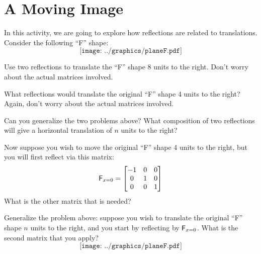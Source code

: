 \newpage
\section{A Moving Image}

In this activity, we are going to explore how reflections are related
to translations.  Consider the following ``F'' shape:
\[
\texttt{[image: ../graphics/planeF.pdf]}
\]

\begin{prob}
Use two reflections to translate the ``F'' shape 8 units to the
right. Don't worry about the actual matrices involved.
\end{prob}

\begin{prob}
What reflections would translate the original ``F'' shape 4 units to
the right? Again, don't worry about the actual matrices involved.
\end{prob}

\begin{prob}
Can you generalize the two problems above? What composition of two
reflections will give a horizontal translation of $n$ units to the
right?
\end{prob}

\begin{prob} 
Now suppose you wish to move the original ``F'' shape 4 units to the
right, but you will first reflect via this matrix:
\[
\mathsf{F}_{x=0}  = 
\begin{bmatrix}
-1 & 0 & 0 \\
0 & 1 & 0 \\
0 & 0 & 1
\end{bmatrix}
\]
What is the other matrix that is needed?
\end{prob}

\begin{prob}
Generalize the problem above: suppose you wish to translate the
original ``F'' shape $n$ units to the right, and you start by
reflecting by $\mathsf{F}_{x=0}$. What is the second matrix that you
apply?
\[
\texttt{[image: ../graphics/planeF.pdf]}
\]
\end{prob}
